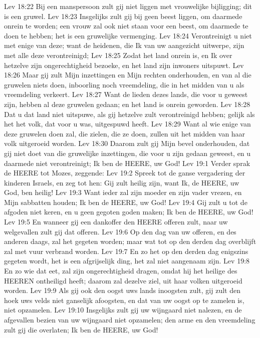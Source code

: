 Lev 18:22  Bij een manspersoon zult gij niet liggen met vrouwelijke bijligging; dit is een gruwel.
Lev 18:23  Insgelijks zult gij bij geen beest liggen, om daarmede onrein te worden; een vrouw zal ook niet staan voor een beest, om daarmede te doen te hebben; het is een gruwelijke vermenging.
Lev 18:24  Verontreinigt u niet met enige van deze; want de heidenen, die Ik van uw aangezicht uitwerpe, zijn met alle deze verontreinigd;
Lev 18:25  Zodat het land onrein is, en Ik over hetzelve zijn ongerechtigheid bezoeke, en het land zijn inwoners uitspuwt.
Lev 18:26  Maar gij zult Mijn inzettingen en Mijn rechten onderhouden, en van al die gruwelen niets doen, inboorling noch vreemdeling, die in het midden van u als vreemdeling verkeert.
Lev 18:27  Want de lieden dezes lands, die voor u geweest zijn, hebben al deze gruwelen gedaan; en het land is onrein geworden.
Lev 18:28  Dat u dat land niet uitspuwe, als gij hetzelve zult verontreinigd hebben; gelijk als het het volk, dat voor u was, uitgespuwd heeft.
Lev 18:29  Want al wie enige van deze gruwelen doen zal, die zielen, die ze doen, zullen uit het midden van haar volk uitgeroeid worden.
Lev 18:30  Daarom zult gij Mijn bevel onderhouden, dat gij niet doet van die gruwelijke inzettingen, die voor u zijn gedaan geweest, en u daarmede niet verontreinigt; Ik ben de HEERE, uw God!
Lev 19:1  Verder sprak de HEERE tot Mozes, zeggende:
Lev 19:2  Spreek tot de ganse vergadering der kinderen Israels, en zeg tot hen: Gij zult heilig zijn, want Ik, de HEERE, uw God, ben heilig!
Lev 19:3  Want ieder zal zijn moeder en zijn vader vrezen, en Mijn sabbatten houden; Ik ben de HEERE, uw God!
Lev 19:4  Gij zult u tot de afgoden niet keren, en u geen gegoten goden maken; Ik ben de HEERE, uw God!
Lev 19:5  En wanneer gij een dankoffer den HEERE offeren zult, naar uw welgevallen zult gij dat offeren.
Lev 19:6  Op den dag van uw offeren, en des anderen daags, zal het gegeten worden; maar wat tot op den derden dag overblijft zal met vuur verbrand worden.
Lev 19:7  En zo het op den derden dag enigszins gegeten wordt, het is een afgrijselijk ding, het zal niet aangenaam zijn.
Lev 19:8  En zo wie dat eet, zal zijn ongerechtigheid dragen, omdat hij het heilige des HEEREN ontheiligd heeft; daarom zal dezelve ziel, uit haar volken uitgeroeid worden.
Lev 19:9  Als gij ook den oogst uws lands inoogsten zult, gij zult den hoek uws velds niet ganselijk afoogsten, en dat van uw oogst op te zamelen is, niet opzamelen.
Lev 19:10  Insgelijks zult gij uw wijngaard niet nalezen, en de afgevallen bezien van uw wijngaard niet opzamelen; den arme en den vreemdeling zult gij die overlaten; Ik ben de HEERE, uw God!
